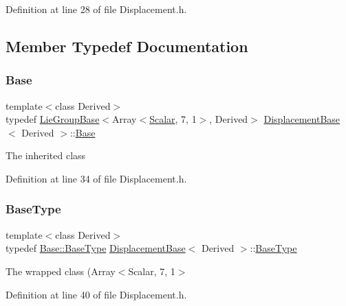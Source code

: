 Definition at line 28 of file Displacement.\+h.



\subsection{Member Typedef Documentation}
\hypertarget{class_displacement_base_ae1eea29b955c12d84603ab1b81bfe3c4}{}\label{class_displacement_base_ae1eea29b955c12d84603ab1b81bfe3c4} 
\subsubsection{\texorpdfstring{Base}{Base}}
{\footnotesize\ttfamily template$<$class Derived$>$ \\
typedef \hyperlink{class_lie_group_base}{Lie\+Group\+Base}$<$Array$<$\hyperlink{class_displacement_base_a978caf313131fd9d221a856a2e4a80ad}{Scalar}, 7, 1$>$, Derived$>$ \hyperlink{class_displacement_base}{Displacement\+Base}$<$ Derived $>$\+::\hyperlink{class_displacement_base_ae1eea29b955c12d84603ab1b81bfe3c4}{Base}\hspace{0.3cm}{\ttfamily [protected]}}

The inherited class 

Definition at line 34 of file Displacement.\+h.

\hypertarget{class_displacement_base_ac2d1983c0f84aa8d974283e3a48a2434}{}\label{class_displacement_base_ac2d1983c0f84aa8d974283e3a48a2434} 
\subsubsection{\texorpdfstring{Base\+Type}{BaseType}}
{\footnotesize\ttfamily template$<$class Derived$>$ \\
typedef \hyperlink{class_lie_group_base_a895bed679f100c71c6dcbfd5532635b0}{Base\+::\+Base\+Type} \hyperlink{class_displacement_base}{Displacement\+Base}$<$ Derived $>$\+::\hyperlink{class_displacement_base_ac2d1983c0f84aa8d974283e3a48a2434}{Base\+Type}}

The wrapped class (Array$<$\+Scalar, 7, 1$>$ 

Definition at line 40 of file Displacement.\+h.

\hypertarget{class_displacement_base_aaa66ea6d4bdfcd9ca5fbfafbc66e78b9}{}\label{class_displacement_base_aaa66ea6d4bdfcd9ca5fbfafbc66e78b9} 
